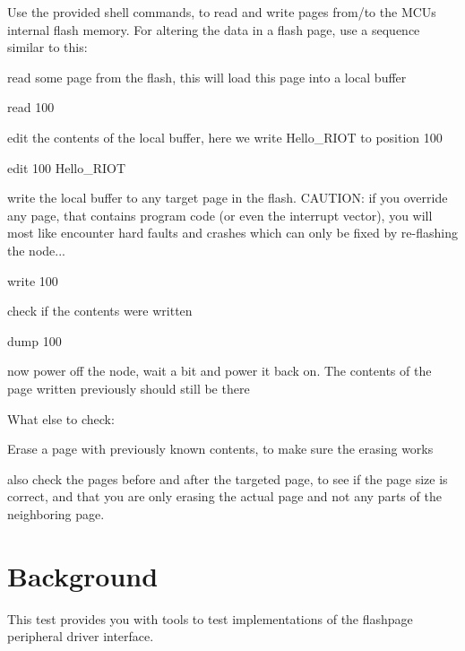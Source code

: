 Use the provided shell commands, to read and write pages from/to the M\+CU\textquotesingle{}s internal flash memory. For altering the data in a flash page, use a sequence similar to this\+:
\begin{DoxyItemize}
\item read some page from the flash, this will load this page into a local buffer 
\begin{DoxyCode}
read 100
\end{DoxyCode}

\item edit the contents of the local buffer, here we write \textquotesingle{}Hello\+\_\+\+R\+I\+OT\textquotesingle{} to position 100 
\begin{DoxyCode}
edit 100 Hello\_RIOT
\end{DoxyCode}

\item write the local buffer to any target page in the flash. C\+A\+U\+T\+I\+ON\+: if you override any page, that contains program code (or even the interrupt vector), you will most like encounter hard faults and crashes which can only be fixed by re-\/flashing the node... 
\begin{DoxyCode}
write 100
\end{DoxyCode}

\item check if the contents were written 
\begin{DoxyCode}
dump 100
\end{DoxyCode}

\item now power off the node, wait a bit and power it back on. The contents of the page written previously should still be there
\end{DoxyItemize}

What else to check\+:
\begin{DoxyItemize}
\item Erase a page with previously known contents, to make sure the erasing works
\item also check the pages before and after the targeted page, to see if the page size is correct, and that you are only erasing the actual page and not any parts of the neighboring page.
\end{DoxyItemize}

\section*{Background }

This test provides you with tools to test implementations of the {\ttfamily flashpage} peripheral driver interface. 